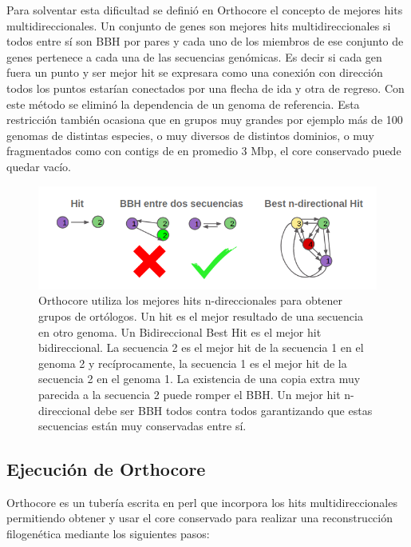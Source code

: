 \documentclass[12pt,twoside]{reedthesis}
\begin{document}
  Para solventar esta dificultad se definió en Orthocore el concepto de
  mejores hits multidireccionales. Un conjunto de genes son mejores hits
  multidireccionales si todos entre sí son BBH por pares y cada uno de los
  miembros de ese conjunto de genes pertenece a cada una de las secuencias
  genómicas. Es decir si cada gen fuera un punto y ser mejor hit se
  expresara como una conexión con dirección todos los puntos estarían
  conectados por una flecha de ida y otra de regreso. Con este método se
  eliminó la dependencia de un genoma de referencia. Esta restricción
  también ocasiona que en grupos muy grandes por ejemplo más de 100
  genomas de distintas especies, o muy diversos de distintos dominios, o
  muy fragmentados como con contigs de en promedio 3 Mbp, el core
  conservado puede quedar vacío.
  
  \begin{figure}[h!tbp]
  \centering
  \includegraphics[angle = 0,scale = .55]{chapter1/Best-n-directional.png}
  \caption[Los mejores hits n-direccionales generalizan a los $Bidirectional~Best~Hits$]{\footnotesize{Orthocore utiliza los mejores hits n-direccionales para obtener grupos de ortólogos. Un hit es el mejor resultado de una secuencia en otro genoma. Un Bidireccional Best Hit es el mejor hit bidireccional. La secuencia 2 es el mejor hit de la secuencia 1 en el genoma 2 y recíprocamente, la secuencia 1 es el mejor hit de la secuencia 2 en el genoma 1. La existencia de una copia extra muy parecida a la secuencia 2 puede romper el BBH. Un mejor hit n-direccional debe ser BBH todos contra todos garantizando que estas secuencias están muy conservadas entre sí.}}
  \label{fig:Best-n-directional}
  \end{figure}
  
  \subsection{Ejecución de Orthocore}\label{ejecucion-de-orthocore}
  
  Orthocore es un tubería escrita en perl que incorpora los hits
  multidireccionales permitiendo obtener y usar el core conservado para
  realizar una reconstrucción filogenética mediante los siguientes pasos:
  
\end{document}
